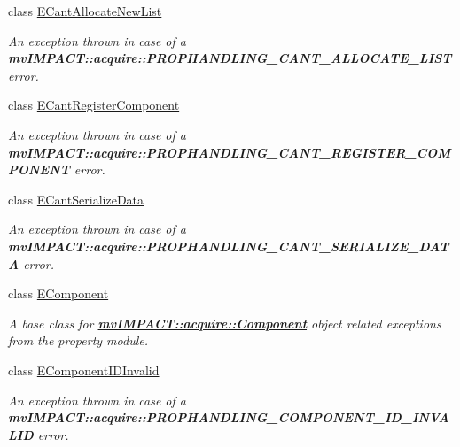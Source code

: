\begin{DoxyCompactItemize}
class \hyperlink{classmv_i_m_p_a_c_t_1_1acquire_1_1_e_cant_allocate_new_list}{E\+Cant\+Allocate\+New\+List}
\begin{DoxyCompactList}\small\item\em An exception thrown in case of a {\bfseries mv\+I\+M\+P\+A\+C\+T\+::acquire\+::\+P\+R\+O\+P\+H\+A\+N\+D\+L\+I\+N\+G\+\_\+\+C\+A\+N\+T\+\_\+\+A\+L\+L\+O\+C\+A\+T\+E\+\_\+\+L\+I\+S\+T} error. \end{DoxyCompactList}\item 
class \hyperlink{classmv_i_m_p_a_c_t_1_1acquire_1_1_e_cant_register_component}{E\+Cant\+Register\+Component}
\begin{DoxyCompactList}\small\item\em An exception thrown in case of a {\bfseries mv\+I\+M\+P\+A\+C\+T\+::acquire\+::\+P\+R\+O\+P\+H\+A\+N\+D\+L\+I\+N\+G\+\_\+\+C\+A\+N\+T\+\_\+\+R\+E\+G\+I\+S\+T\+E\+R\+\_\+\+C\+O\+M\+P\+O\+N\+E\+N\+T} error. \end{DoxyCompactList}\item 
class \hyperlink{classmv_i_m_p_a_c_t_1_1acquire_1_1_e_cant_serialize_data}{E\+Cant\+Serialize\+Data}
\begin{DoxyCompactList}\small\item\em An exception thrown in case of a {\bfseries mv\+I\+M\+P\+A\+C\+T\+::acquire\+::\+P\+R\+O\+P\+H\+A\+N\+D\+L\+I\+N\+G\+\_\+\+C\+A\+N\+T\+\_\+\+S\+E\+R\+I\+A\+L\+I\+Z\+E\+\_\+\+D\+A\+T\+A} error. \end{DoxyCompactList}\item 
class \hyperlink{classmv_i_m_p_a_c_t_1_1acquire_1_1_e_component}{E\+Component}
\begin{DoxyCompactList}\small\item\em A base class for {\bfseries \hyperlink{classmv_i_m_p_a_c_t_1_1acquire_1_1_component}{mv\+I\+M\+P\+A\+C\+T\+::acquire\+::\+Component}} object related exceptions from the property module. \end{DoxyCompactList}\item 
class \hyperlink{classmv_i_m_p_a_c_t_1_1acquire_1_1_e_component_i_d_invalid}{E\+Component\+I\+D\+Invalid}
\begin{DoxyCompactList}\small\item\em An exception thrown in case of a {\bfseries mv\+I\+M\+P\+A\+C\+T\+::acquire\+::\+P\+R\+O\+P\+H\+A\+N\+D\+L\+I\+N\+G\+\_\+\+C\+O\+M\+P\+O\+N\+E\+N\+T\+\_\+\+I\+D\+\_\+\+I\+N\+V\+A\+L\+I\+D} error. \end{DoxyCompactList}\item 

\end{DoxyCompactItemize}
